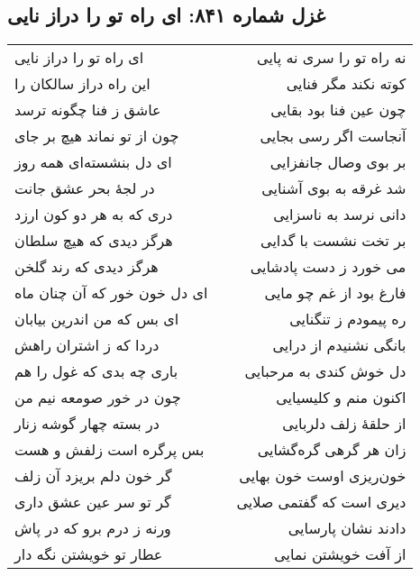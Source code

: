 \begin{center}
\section*{غزل شماره ۸۴۱: ای راه تو را دراز نایی}
\label{sec:841}
\begin{longtable}{l p{0.5cm} r}
ای راه تو را دراز نایی
&&
نه راه تو را سری نه پایی
\\
این راه دراز سالکان را
&&
کوته نکند مگر فنایی
\\
عاشق ز فنا چگونه ترسد
&&
چون عین فنا بود بقایی
\\
چون از تو نماند هیچ بر جای
&&
آنجاست اگر رسی بجایی
\\
ای دل بنشسته‌ای همه روز
&&
بر بوی وصال جانفزایی
\\
در لجهٔ بحر عشق جانت
&&
شد غرقه به بوی آشنایی
\\
دری که به هر دو کون ارزد
&&
دانی نرسد به ناسزایی
\\
هرگز دیدی که هیچ سلطان
&&
بر تخت نشست با گدایی
\\
هرگز دیدی که رند گلخن
&&
می خورد ز دست پادشایی
\\
ای دل خون خور که آن چنان ماه
&&
فارغ بود از غم چو مایی
\\
ای بس که من اندرین بیابان
&&
ره پیمودم ز تنگنایی
\\
دردا که ز اشتران راهش
&&
بانگی نشنیدم از درایی
\\
باری چه بدی که غول را هم
&&
دل خوش کندی به مرحبایی
\\
چون در خور صومعه نیم من
&&
اکنون منم و کلیسیایی
\\
در بسته چهار گوشه زنار
&&
از حلقهٔ زلف دلربایی
\\
بس پرگره است زلفش و هست
&&
زان هر گرهی گره‌گشایی
\\
گر خون دلم بریزد آن زلف
&&
خون‌ریزی اوست خون بهایی
\\
گر تو سر عین عشق داری
&&
دیری است که گفتمی صلایی
\\
ورنه ز درم برو که در پاش
&&
دادند نشان پارسایی
\\
عطار تو خویشتن نگه دار
&&
از آفت خویشتن نمایی
\\
\end{longtable}
\end{center}
